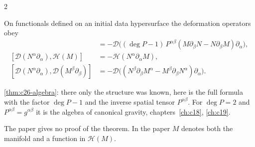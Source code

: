 \begin{paracol}{2}
\begin{theorem}\label{thm:c29-algebra}
On functionals defined on an initial data hypersurface the deformation operators obey
\begin{align*}
  [\mathcal H(N),\mathcal H(M)]&=-\mathcal D\bigl((\deg P-1)\,P^{\alpha\beta}(M\partial_\beta N-N\partial_\beta M)\partial_\alpha\bigr),\\
  [\mathcal D(N^\alpha\partial_\alpha),\mathcal H(M)]&=-\mathcal H(N^\alpha\partial_\alpha M),\\
  [\mathcal D(N^\alpha\partial_\alpha),\mathcal D(M^\beta\partial_\beta)]&=-\mathcal D\bigl((N^\beta\partial_\beta M^\alpha-M^\beta\partial_\beta N^\alpha)\partial_\alpha\bigr).
\end{align*}
\end{theorem}
\begin{recall}
\cref{thm:c26-algebra}: there only the structure was known, here is the full formula with the factor $\deg P-1$ and the inverse spatial tensor $P^{\alpha\beta}$. For $\deg P=2$ and $P^{\alpha\beta}=g^{\alpha\beta}$ it is the algebra of canonical gravity, chapters~\ref{ch:c18}, \ref{ch:c19}.
\end{recall}
The paper gives no proof of the theorem. In the paper $M$ denotes both the manifold and a function in $\mathcal H(M)$.


\end{paracol}
